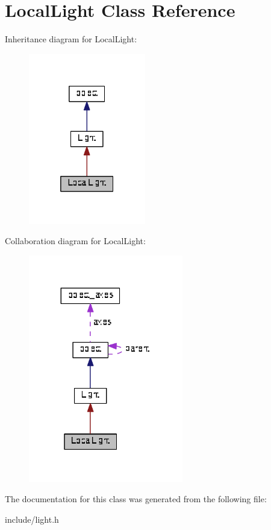 \hypertarget{classLocalLight}{}\section{Local\+Light Class Reference}
\label{classLocalLight}


Inheritance diagram for Local\+Light\+:\nopagebreak
\begin{figure}[H]
\begin{center}
\leavevmode
\includegraphics[width=145pt]{classLocalLight__inherit__graph}
\end{center}
\end{figure}


Collaboration diagram for Local\+Light\+:\nopagebreak
\begin{figure}[H]
\begin{center}
\leavevmode
\includegraphics[width=191pt]{classLocalLight__coll__graph}
\end{center}
\end{figure}


The documentation for this class was generated from the following file\+:\begin{DoxyCompactItemize}
\item 
include/light.\+h\end{DoxyCompactItemize}
